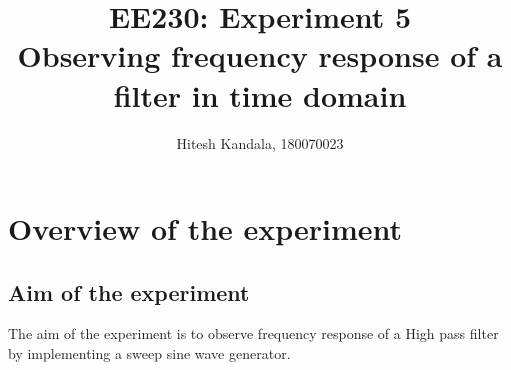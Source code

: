 \documentclass[12pt]{article}
\title{EE230: Experiment 5\\
Observing frequency response of a filter in time domain}
\author{Hitesh Kandala, 180070023}
\begin{document}
\maketitle

\section{Overview of the experiment}

    \subsection{Aim of the experiment}
        The aim of the experiment is to observe frequency response of a High pass filter by implementing a sweep sine wave generator.
\end{document}
